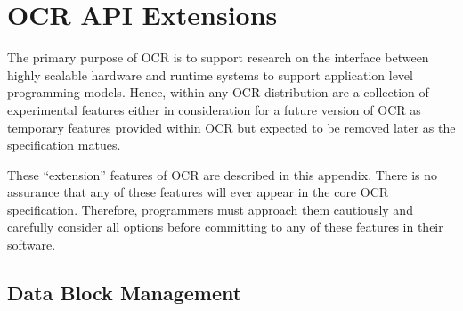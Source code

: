 %

\chapter{OCR API Extensions}
\label{chap:OCR API Extensions}
\label{chap:Appendix B}

The primary purpose of OCR is to support research on the interface between
highly scalable hardware and runtime systems to support application level programming
models.   Hence, within any OCR distribution are a collection of experimental features
either in consideration for a future version of OCR as  temporary features
provided within OCR but expected to be removed later as the specification matues.

These ``extension'' features of OCR are described in this appendix.  There is no
assurance that any of these features will ever appear in the core OCR specification.
Therefore, programmers must approach them cautiously and carefully consider
all options before committing to any of these features in their software.

\section{Data Block Management}


